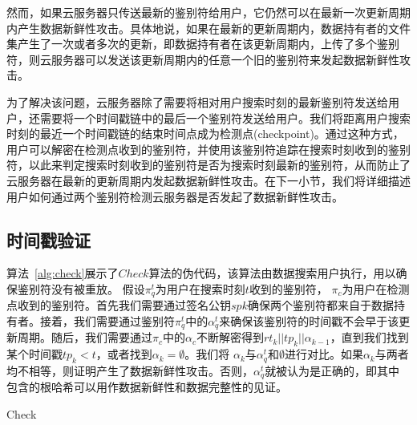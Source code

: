 然而，如果云服务器只传送最新的鉴别符给用户，它仍然可以在最新一次更新周期内产生数据新鲜性攻击。具体地说，如果在最新的更新周期内，数据持有者的文件集产生了一次或者多次的更新，即数据持有者在该更新周期内，上传了多个鉴别符，则云服务器可以发送该更新周期内的任意一个旧的鉴别符来发起数据新鲜性攻击。

为了解决该问题，云服务器除了需要将相对用户搜索时刻的最新鉴别符发送给用户，还需要将一个时间戳链中的最后一个鉴别符发送给用户。我们将距离用户搜索时刻的最近一个时间戳链的结束时间点成为检测点(checkpoint)。通过这种方式，用户可以解密在检测点收到的鉴别符，并使用该鉴别符追踪在搜索时刻收到的鉴别符，以此来判定搜索时刻收到的鉴别符是否为搜索时刻最新的鉴别符，从而防止了云服务器在最新的更新周期内发起数据新鲜性攻击。在下一小节，我们将详细描述用户如何通过两个鉴别符检测云服务器是否发起了数据新鲜性攻击。


\subsection{时间戳验证}
算法~\ref{alg:check}展示了$Check$算法的伪代码，该算法由数据搜索用户执行，用以确保鉴别符没有被重放。
假设$\pi^t_q$为用户在搜索时刻$t$收到的鉴别符， $\pi_c$为用户在检测点收到的鉴别符。首先我们需要通过签名公钥$spk$确保两个鉴别符都来自于数据持有者。接着，我们需要通过鉴别符$\pi^t_q$中的$\alpha^t_q$来确保该鉴别符的时间戳不会早于该更新周期。随后，我们需要通过$\pi_c$中的$\alpha_c$不断解密得到$rt_k||tp_k||\alpha_{k-1}$，直到我们找到某个时间戳$tp_k < t$，或者找到$\alpha_k = \emptyset$。我们将  $\alpha_k$与$\alpha^t_q$和$\emptyset$进行对比。如果$\alpha_k$与两者均不相等，则证明产生了数据新鲜性攻击。否则，$\alpha^t_q$就被认为是正确的，即其中包含的根哈希可以用作数据新鲜性和数据完整性的见证。



\begin{algorithm}[t]
  \caption{Check}
  \label{alg:check}
  \begin{algorithmic}[1]
              \ENDIF
              \ENDIF
                    \ENDIF
              \ENDFOR
              \ELSE
              \ENDIF
  \end{algorithmic}
\end{algorithm}

